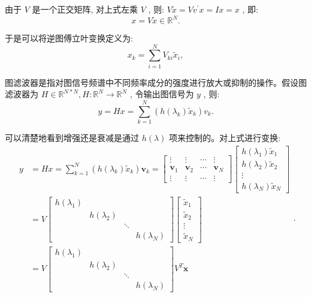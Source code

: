 由于 \({V}\) 是一个正交矩阵, 对上式左乘 \({V}\) , 则: \({V}\tilde{x} = {V}v^{\prime }{x} = {{Ix}} = {x}\) , 即:
\begin{equation}
{x} = {V}\tilde{x} \in  \mathbb{R}^N.
\end{equation}

于是可以将逆图傅立叶变换定义为:
\begin{equation}
{x}_{k} = \sum\limits_{{i = 1}}^{N}{V}_{ki}{\tilde{x}}_{i}, 
\end{equation}

图滤波器是指对图信号频谱中不同频率成分的强度进行放大或抑制的操作。假设图滤波器为 \({H} \in  {\mathbb{R}}^{{N} * {N}}, {H} : \mathbb{R}^N \rightarrow  \mathbb{R}^N\) , 令输出图信号为 \({y}\) , 则:
\begin{equation}
{y} = {{Hx}} = \sum\limits_{{{k} = 1}}^{{N}}\left( {{h}\left( {\lambda }_{k}\right) {\tilde{x}}_{{k}}}\right) v_{{k}}.
\end{equation}

可以清楚地看到增强还是衰减是通过 \({h}\left( \lambda \right)\) 项来控制的。对上式进行变换:
\begin{equation}
\begin{aligned}
y & =H x=\sum_{k=1}^N\left(h\left(\lambda_k\right) \tilde{x}_k\right) \boldsymbol{v}_k=\left[\begin{array}{cccc}
\vdots & \vdots & \cdots & \vdots \\
\boldsymbol{v}_1 & \boldsymbol{v}_2 & \cdots & \boldsymbol{v}_N \\
\vdots & \vdots & \cdots & \vdots
\end{array}\right]\left[\begin{array}{c}
h\left(\lambda_1\right) \tilde{x}_1 \\
h\left(\lambda_2\right) \tilde{x}_2 \\
\vdots \\
h\left(\lambda_N\right) \tilde{x}_N
\end{array}\right] \\
& =V\left[\begin{array}{cccc}
h\left(\lambda_1\right) & & & \\
& h\left(\lambda_2\right) & & \\
& & \ddots & \\
& & & h\left(\lambda_N\right)
\end{array}\right]\left[\begin{array}{c}
\tilde{x}_1 \\
\tilde{x}_2 \\
\vdots \\
\tilde{x}_N
\end{array}\right] \\
& =V\left[\begin{array}{cccc}
h\left(\lambda_1\right) & & & \\
& h\left(\lambda_2\right) & & \\
& & \ddots & \\
& & & h\left(\lambda_N\right)
\end{array}\right] V^{T} \boldsymbol{x}
\end{aligned}.
\end{equation}


